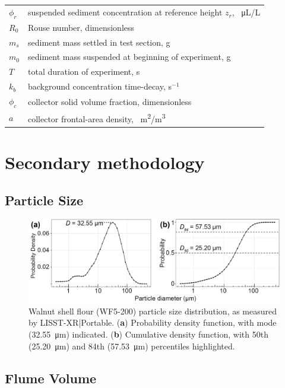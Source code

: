 \documentclass[geosciences,article,submit,moreauthors,pdftex]{Definitions/mdpi}
\begin{document}
{\begin{tabular}{@{}ll}
 $\phi_r$ & suspended sediment concentration at reference height $z_r$, \SI{}{\micro\liter/\liter} \\
 $R_0$ & Rouse number, dimensionless \\
 $m_s$ & sediment mass settled in test section, g \\
 $m_0$ & sediment mass suspended at beginning of experiment, g \\
 $T$ & total duration of experiment, s \\
 $k_b$ & background concentration time-decay, s$^{-1}$ \\
 $\phi_c$ & collector solid volume fraction, dimensionless \\
 $a$ & collector frontal-area density, \SI{}{\metre\squared/\metre\cubed}
 \end{tabular}}

\appendix
\section{Secondary methodology}
\unskip
\subsection{Particle Size}
\begin{figure}[H]
\centering
\includegraphics[width=5in]{../pics/wf5-200sizedist.png}
\caption{Walnut shell flour (WF5-200) particle size distribution, as measured by LISST-XR|Portable. (\textbf{a}) Probability density function, with mode (\SI{32.55}{\micro\metre}) indicated. (\textbf{b}) Cumulative density function, with 50th (\SI{25.20}{\micro\metre}) and 84th (\SI{57.53}{\micro\metre}) percentiles highlighted.}
\end{figure}

\subsection{Flume Volume}
\end{document}
